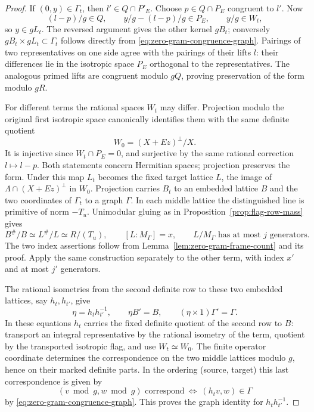 \begin{proof}
If \((0,y)\in\Gamma_t\), then \(l'\in Q\cap P'_E\).
Choose \(p\in Q\cap P_E\) congruent to \(l'\). Now
\[
      (l-p)/g\in Q,\qquad y/g-(l-p)/g\in P_E,\qquad y/g\in W_t ,
\]
so \(y\in gL_t\). The reversed argument gives the other kernel
\(gB_t\); conversely \(gB_t\times gL_t\subset\Gamma_t\) follows
directly from \eqref{eq:zero-gram-congruence-graph}. Pairings of
two representatives on one side agree with the pairings of their
lifts \(l\): their differences lie in the isotropic space \(P_E\)
orthogonal to the representatives. The analogous primed lifts are
congruent modulo \(gQ\), proving preservation of the form modulo \(gR\).

For different terms the rational spaces \(W_t\) may differ.
Projection modulo the original first isotropic space canonically
identifies them with the same definite quotient
\[
        W_0=(X+Ez)^\perp/X .
\]
It is injective since \(W_t\cap P_E=0\), and surjective by the
same rational correction \(l\mapsto l-p\). Both statements concern
Hermitian spaces; projection preserves the form. Under this map \(L_t\)
becomes the fixed target lattice \(L\), the image of
\(\Lambda\cap(X+Ez)^\perp\) in \(W_0\).
Projection carries \(B_t\) to an embedded lattice \(B\) and the
two coordinates of \(\Gamma_t\) to a graph \(\Gamma\). In each middle
lattice the distinguished line is primitive of norm \(-T_u\).
Unimodular gluing as in Proposition~\ref{prop:flag-row-mass} gives
\[
 B^\#/B\simeq L^\#/L\simeq R/(T_u),\qquad
 [L:M_\Gamma]=x,\qquad L/M_\Gamma\text{ has at most }j\text{ generators}.
\]
The two index assertions follow from
Lemma~\ref{lem:zero-gram-frame-count} and its proof. Apply the
same construction separately to the other term, with index \(x'\)
and at most \(j'\) generators.

The rational isometries from the second definite row to these
two embedded lattices, say \(h_t,h_{t'}\), give
\[
   \eta=h_t h_{t'}^{-1},\qquad
   \eta B'=B,\qquad(\eta\times1)\Gamma'=\Gamma .
\]
In these equations \(h_t\) carries the fixed definite quotient
of the second row to \(B\): transport an integral representative by
the rational isometry of the term, quotient by the transported
isotropic flag, and use \(W_t\simeq W_0\). The finite operator coordinate determines the correspondence
on the two middle lattices modulo \(g\), hence on their marked
definite parts. In the ordering (source, target) this last
correspondence is given by
\[
 (v\bmod g,w\bmod g)\text{ correspond}\ \Longleftrightarrow\
 (h_t v,w)\in\Gamma
\]
by \eqref{eq:zero-gram-congruence-graph}. This proves the graph identity for \(h_th_{t'}^{-1}\).


\end{proof}
